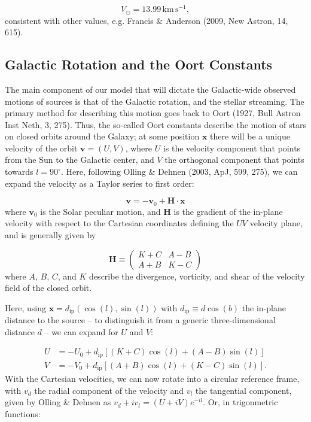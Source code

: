 \documentclass[fleqn,usenatbib]{mnras}
\begin{document}
\begin{equation}
    V_\odot = 13.99\,\mathrm{km}\,\mathrm{s}^{-1},
\end{equation}
consistent with other values, e.g. Francis \& Anderson (2009, New Astron, 14, 615).

\subsection{Galactic Rotation and the Oort Constants}
The main component of our model that will dictate the Galactic-wide observed motions of sources is that of the Galactic rotation, and the stellar streaming.
The primary method for describing this motion goes back to Oort (1927, Bull Astron Inst Neth, 3, 275).
Thus, the so-called Oort constants describe the motion of stars on closed orbits around the Galaxy; at some position $\bm{x}$ there will be a unique velocity of the orbit $\bm{v} = (U, V)$, where $U$ is the velocity component that points from the Sun to the Galactic center, and $V$ the orthogonal component that points towards $l = 90^\circ$.
Here, following Olling \& Dehnen (2003, ApJ, 599, 275), we can expand the velocity as a Taylor series to first order:

\begin{equation}
    \bm{v} = -\bm{v}_0 + \bm{H} \cdot \bm{x}
\end{equation}
where $\bm{v}_0$ is the Solar peculiar motion, and $\bm{H}$ is the gradient of the in-plane velocity with respect to the Cartesian coordinates defining the $UV$ velocity plane, and is generally given by

\begin{equation}
    \bm{H} \equiv \left(\begin{matrix} K + C & A - B \\ A + B & K - C \end{matrix} \right)
\end{equation}
where $A$, $B$, $C$, and $K$ describe the divergence, vorticity, and shear of the velocity field of the closed orbit.

Here, using $\bm{x} = d_\mathrm{ip}\left(\cos(l), \sin(l)\right)$ with $d_\mathrm{ip} \equiv d \cos(b)$ the in-plane distance to the source -- to distinguish it from a generic three-dimensional distance $d$ -- we can expand for $U$ and $V$:

\begin{align}
    U &= -U_0 + d_\mathrm{ip} \left[(K + C)\cos(l) + (A - B)\sin(l)\right] \\
    V &= -V_0 + d_\mathrm{ip} \left[(A + B)\cos(l) + (K - C)\sin(l)\right].
\end{align}
With the Cartesian velocities, we can now rotate into a circular reference frame, with $v_d$ the radial component of the velocity and $v_l$ the tangential component, given by Olling \& Dehnen as $v_d + iv_l = (U + iV)e^{-il}$.
Or, in trigonmetric functions:
\end{document}
